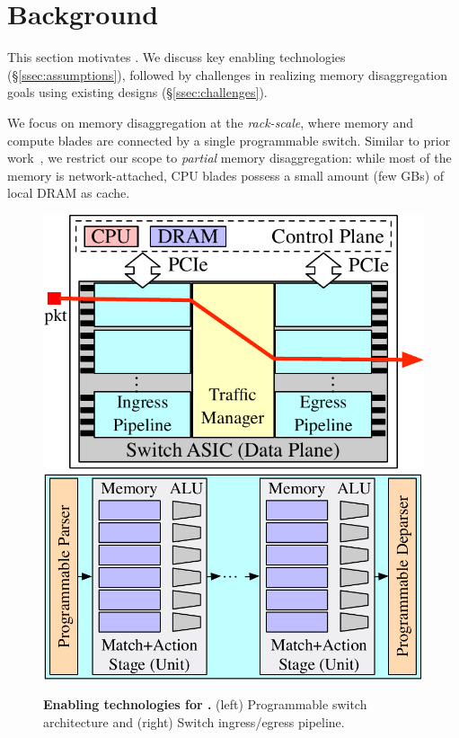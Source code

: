 \section{Background}
\label{sec:mindbackground}

This section motivates \mind. We discuss key enabling technologies (\S\ref{ssec:assumptions}), followed by challenges in realizing memory disaggregation goals using existing designs (\S\ref{ssec:challenges}).

 We focus on memory disaggregation at the \textit{rack-scale}, where memory and compute blades are connected by a single programmable switch. Similar to prior work~\cite{memdisagg2, memdisagg3, memdisagg4, memdisagg5, memdisagg6, memdisagg1, legoos, disagg}, we restrict our scope to \textit{partial} memory disaggregation: while most of the memory is network-attached, CPU blades possess a small amount (few GBs) of local DRAM as cache.

\begin{figure}[t]
  \centering
  \includegraphics[width=0.44\columnwidth]{fig/mind/prog-switch.pdf}\hfill
  \includegraphics[width=0.54\columnwidth]{fig/mind/prog-pipeline.pdf}
  \vspace{-0.7em}
  \caption{\textbf{Enabling technologies for \mind.} (left) Programmable switch architecture and (right) Switch ingress/egress pipeline.}
  \vspace{-0.5em}
  \label{fig:trad-directory}
  \label{fig:prog-pipeline}
  \label{fig:background}
\end{figure}

